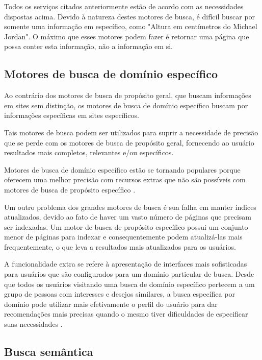 Todos os serviços citados anteriormente estão de acordo com as necessidades dispostas acima. Devido à natureza destes motores de busca, é difícil buscar por somente uma informação em específico, como "Altura em centímetros do Michael Jordan". O máximo que esses motores podem fazer é retornar uma página que possa conter esta informação, não a informação em si.

\subsection{Motores de busca de domínio específico}

Ao contrário dos motores de busca de propósito geral, que buscam informações em sites sem distinção, os motores de busca de domínio específico buscam por informações específicas em sites específicos.

Tais motores de busca podem ser utilizados para suprir a necessidade de precisão que se perde com os motores de busca de propósito geral, fornecendo ao usuário resultados mais completos, relevantes e/ou específicos.

Motores de busca de domínio específico estão se tornando populares porque oferecem uma melhor precisão com recursos extras que não são possíveis com motores de busca de propósito específico \cite[p. 8]{wober}.

Um outro problema dos grandes motores de busca é sua falha em manter índices atualizados, devido ao fato de haver um vasto número de páginas que precisam ser indexadas. Um motor de busca de propósito específico possui um conjunto menor de páginas para indexar e consequentemente podem atualizá-las mais frequentemente, o que leva a resultados mais atualizados para os usuários.

A funcionalidade extra se refere à apresentação de interfaces mais sofisticadas para usuários que são configurados para um domínio particular de busca. Desde que todos os usuários visitando uma busca de domínio específico pertecem a um grupo de pessoas com interesses e desejos similares, a busca específica por domínio pode utilizar mais efetivamente o perfil do usuário para dar recomendações mais precisas quando o mesmo tiver dificuldades de especificar suas necessidades \cite[p. 9]{wober}.

\subsection{Busca semântica}

